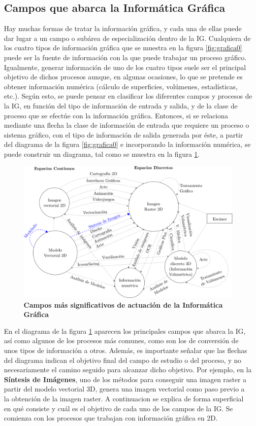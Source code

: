 \subsection{Campos que abarca la Informática Gráfica}
Hay muchas formas de tratar la información gráfica, y cada una de ellas puede dar lugar a un campo o subárea de especialización dentro de la IG.
Cualquiera de los cuatro tipos de información gráfica que se muestra en la figura \ref{fig:grafica0} puede ser la fuente de información con la que puede trabajar un proceso gráfico. Igualmente, generar información de uno de los cuatro tipos suele ser el principal objetivo de dichos procesos aunque, en algunas ocasiones, lo que se pretende es obtener información numérica (cálculo de superficies, volúmenes, estadísticas, etc.).
Según esto, se puede pensar en clasificar los diferentes campos y procesos de la IG, en función del tipo de información de entrada y salida, y de la clase de proceso que se efectúe con la información gráfica.
Entonces, si se relaciona mediante una flecha la clase de información de entrada que requiere un proceso o sistema gráfico, con el tipo de información de salida generada por éste, a partir del diagrama de la figura \ref{fig:grafica0} e incorporando la información numérica, se puede construir un diagrama, tal como se muestra en la figura \ref{fig:grafica1}.

\begin{figure}[h]
\includegraphics[width=16cm]{Img/CPD/grafica1.png}
\centering
\caption{\textbf{\footnotesize{Campos más significativos de actuación de la Informática Gráfica}}}
\label{fig:grafica1}
\end{figure}

En el diagrama de la figura \ref{fig:grafica1} aparecen los principales campos que abarca la IG, así como algunos de los procesos más comunes, como son los de conversión de unos tipos de información a otros. Además, es importante señalar que las flechas del diagrama indican el objetivo final del campo de estudio o del proceso, y no necesariamente el camino seguido para alcanzar dicho objetivo. Por ejemplo, en la \textbf{Síntesis de Imágenes}, uno de los métodos para conseguir una imagen raster a partir del modelo vectorial 3D, genera una imagen vectorial como paso previo a la obtención de la imagen raster.
A continuacion se explica de forma superficial en qué consiste y cuál es el objetivo de cada uno de los campos de la IG. Se comienza con los procesos que trabajan con información gráfica en 2D.


